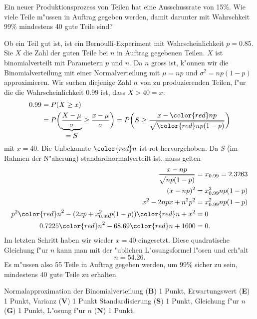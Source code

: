 Ein neuer Produktionsprozess von Teilen hat eine Ausschussrate von 15\%.
Wie viele Teile m"ussen in Auftrag gegeben werden, damit darunter
mit Wahrschkeit 99\% mindestens 40 gute Teile sind?



\begin{loesung}
Ob ein Teil gut ist, ist ein Bernoulli-Experiment mit Wahrscheinlichkeit
$p=0.85$.
Sie $X$ die Zahl der guten Teile bei $n$ in Auftrag gegebenen Teilen.
$X$ ist binomialverteilt mit Parametern $p$ und $n$.
Da $n$ gross ist, k"onnen wir die Binomialverteilung mit einer
Normalverteilung mit $\mu=np$ und $\sigma^2=np(1-p)$ approximieren.
Wir suchen diejenige Zahl $n$ von zu produzierenden Teilen, f"ur
die die Wahrscheinlichkeit $0.99$ ist, dass $X>40 =x$:
\begin{align*}
0.99
&=
P(X\ge x)\\
&=
P\biggl(\underbrace{\frac{X-\mu}{\sigma}}_{\displaystyle=S}\ge \frac{x-\mu}{\sigma}\biggr)
=
P\biggl(S\ge \frac{x-{\color{red}n}p}{\sqrt{{\color{red}n}p(1-p)}}\biggr)
\end{align*}
mit $x=40$.
Die Unbekannte $\color{red}n$ ist rot hervorgehoben.
Da $S$ (im Rahmen der N"aherung) standardnormalverteilt ist, muss
gelten
\begin{align*}
\frac{x-np}{\sqrt{np(1-p)}}
&=
x_{0.99}=2.3263
\\
(x-np)^2
&=
x_{0.99}^2np(1-p)
\\
x^2-2npx+n^2p^2
&=
x_{0.99}^2np(1-p)
\\
p^2{\color{red}n}^2
-
(2xp+x_{0.99}^2p(1-p)) {\color{red}n}
+
x^2
&=0
\\
0.7225 {\color{red}n}^2 -68.69 {\color{red}n} + 1600
&= 
0.
\end{align*}
Im letzten Schritt haben wir wieder $x=40$ eingesetzt.
Diese quadratische Gleichung f"ur $n$ kann man mit der "ublichen
L"osungsformel l"osen und erh"alt
\[
n=54.26.
\]
Es m"ussen also 55 Teile in Auftrag gegeben werden, um 99\% sicher zu sein,
mindestens 40 gute Teile zu erhalten.
\end{loesung}

\begin{bewertung}
Normalapproximation der Binomialverteilung ({\bf B}) 1 Punkt,
Erwartungswert ({\bf E}) 1 Punkt,
Varianz ({\bf V}) 1 Punkt
Standardisierung ({\bf S}) 1 Punkt,
Gleichung f"ur $n$ ({\bf G}) 1 Punkt,
L"osung f"ur $n$ ({\bf N}) 1 Punkt.
\end{bewertung}
